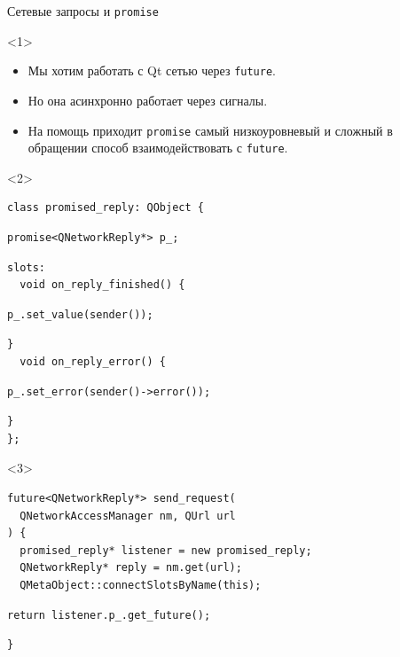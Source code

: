 \documentclass[aspectratio=169,hyperref={unicode},17pt]{beamer}
\begin{document}
\begin{frame}[fragile,t]{Сетевые запросы и \texttt{promise}}
\begin{onlyenv}<1>
\begin{itemize}
 \item Мы хотим работать с Qt сетью через \texttt{future}.
 \item Но она асинхронно работает через сигналы.
 \item На помощь приходит \texttt{promise} самый низкоуровневый и сложный в обращении способ взаимодействовать с \texttt{future}.
\end{itemize}
\end{onlyenv}
\begin{onlyenv}<2>
\begin{lstlisting}[style=cppcode,belowskip=0pt]
class promised_reply: QObject {
\end{lstlisting}
\begin{lstlisting}[style=cppcode,backgroundcolor=\color{gray!30},aboveskip=0pt,belowskip=0pt]
  promise<QNetworkReply*> p_;
\end{lstlisting}
\begin{lstlisting}[style=cppcode,aboveskip=0pt,belowskip=0pt]
slots:
  void on_reply_finished() {
\end{lstlisting}
\begin{lstlisting}[style=cppcode,backgroundcolor=\color{gray!30},aboveskip=0pt,belowskip=0pt]
    p_.set_value(sender());
\end{lstlisting}
\begin{lstlisting}[style=cppcode,aboveskip=0pt,belowskip=0pt]
  }
  void on_reply_error() {
\end{lstlisting}
\begin{lstlisting}[style=cppcode,backgroundcolor=\color{gray!30},aboveskip=0pt,belowskip=0pt]
    p_.set_error(sender()->error());
\end{lstlisting}
\begin{lstlisting}[style=cppcode,aboveskip=0pt,belowskip=0pt]
  }
};
\end{lstlisting}
\end{onlyenv}
\begin{onlyenv}<3>
\begin{lstlisting}[style=cppcode,belowskip=0pt]
future<QNetworkReply*> send_request(
  QNetworkAccessManager nm, QUrl url
) {
  promised_reply* listener = new promised_reply;
  QNetworkReply* reply = nm.get(url);
  QMetaObject::connectSlotsByName(this);
\end{lstlisting}
\begin{lstlisting}[style=cppcode,backgroundcolor=\color{gray!30},aboveskip=0pt,belowskip=0pt]
  return listener.p_.get_future();
\end{lstlisting}
\begin{lstlisting}[style=cppcode,aboveskip=0pt,belowskip=0pt]
}
\end{lstlisting}
\end{onlyenv}
\end{frame}
\end{document}
